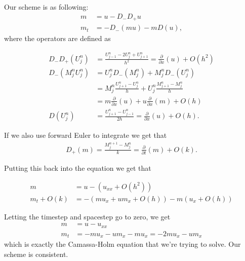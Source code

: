Our scheme is as following:
\begin{align}
m &= u - D_- D_+ u \\
m_t &=- D_- ( m u ) - m D ( u ),
\end{align}
where the operators are defined as

\begin{align}
D_- D_+ \left( U_j^n \right)  &= \frac{U_{j-1}^n - 2 U_j^n + U_{j+1}^n}{h^2} = \frac{\partial}{\partial x} (u) + O \left( h^ 2 \right) \\
 D_- \left(M_j^n U_j^n \right) &= U_j^n D_-( M_j^n ) + M_j^n D_- (U_j^n) \\
  &= M_j^n \frac{U_{j+1}^n - U_j^n}{h} + U_j^n \frac{M_{j+1}^n - M_j^n}{h} \\
  &= m \frac{\partial}{\partial x} (u) + u \frac{\partial}{\partial x} (m) + O \left( h \right)  \\
D \left(U_j^n \right) &= \frac{U_{j+1}^n - U_{j-1}^n}{2h} = \frac{\partial}{\partial x} (u) + O \left( h \right).
\end{align}

If we also use forward Euler to integrate we get that
\begin{align}
D_+ (m) = \frac{M_j^{n+1} - M_j^n}{k} =  \frac{\partial}{\partial t} (m) + O(k).
\end{align}

Putting this back into the equation we get that

\begin{align}
m &= u - \left( u_{xx} + O\left(h^2\right) \right) \\
m_t  + O(k) &= - \left( m u_x + u m_x + O(h) \right) - m \left( u_x + O(h) \right)
\end{align}

Letting the timestep and spacestep go to zero, we get
\begin{align}
m &= u - u_{xx} \\
m_t &= - m u_x - u m_x - m u_x = - 2m u_x - u m_x
\end{align}
which is exactly the Camassa-Holm equation that we're trying to solve. Our scheme is consistent.